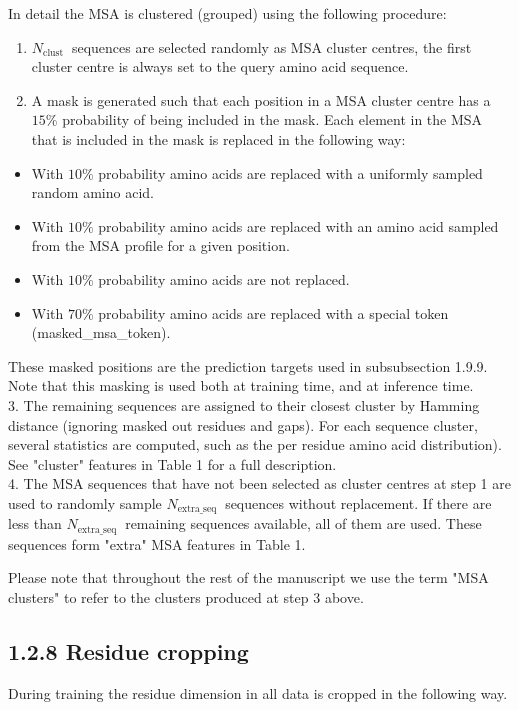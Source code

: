 \documentclass[10pt]{article}
\begin{document}
In detail the MSA is clustered (grouped) using the following procedure:

\begin{enumerate}
  \item $N_{\text {clust }}$ sequences are selected randomly as MSA cluster centres, the first cluster centre is always set to the query amino acid sequence.
  \item A mask is generated such that each position in a MSA cluster centre has a $15 \%$ probability of being included in the mask. Each element in the MSA that is included in the mask is replaced in the following way:
\end{enumerate}

\begin{itemize}
  \item With $10 \%$ probability amino acids are replaced with a uniformly sampled random amino acid.
  \item With $10 \%$ probability amino acids are replaced with an amino acid sampled from the MSA profile for a given position.
  \item With $10 \%$ probability amino acids are not replaced.
  \item With $70 \%$ probability amino acids are replaced with a special token (masked\_msa\_token).
\end{itemize}

These masked positions are the prediction targets used in subsubsection 1.9.9. Note that this masking is used both at training time, and at inference time.\\
3. The remaining sequences are assigned to their closest cluster by Hamming distance (ignoring masked out residues and gaps). For each sequence cluster, several statistics are computed, such as the per residue amino acid distribution). See "cluster" features in Table 1 for a full description.\\
4. The MSA sequences that have not been selected as cluster centres at step 1 are used to randomly sample $N_{\text {extra_seq }}$ sequences without replacement. If there are less than $N_{\text {extra_seq }}$ remaining sequences available, all of them are used. These sequences form "extra" MSA features in Table 1.

Please note that throughout the rest of the manuscript we use the term "MSA clusters" to refer to the clusters produced at step 3 above.

\subsection*{1.2.8 Residue cropping}
During training the residue dimension in all data is cropped in the following way.
\end{document}
